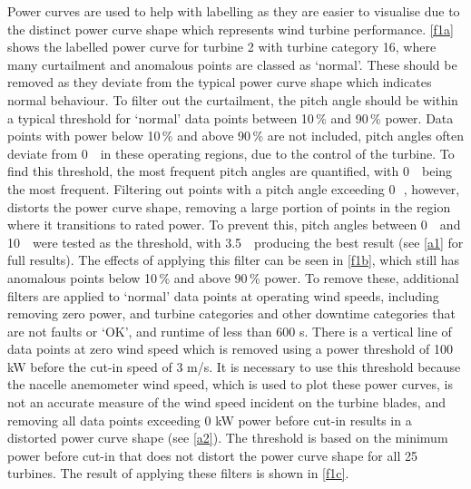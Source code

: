 Power curves are used to help with labelling as they are easier to visualise
due to the distinct power curve shape which represents wind turbine
performance. \autoref{f1a} shows the labelled power curve for turbine 2 with
turbine category 16, where many curtailment and anomalous points are classed
as `normal'. These should be removed as they deviate from the typical power
curve shape which indicates normal behaviour. To filter out the curtailment,
the pitch angle should be within a typical threshold for `normal' data points
between 10\,\% and 90\,\% power. Data points with power below 10\,\% and above
90\,\% are not included, pitch angles often deviate from 0\,\textdegree~ in
these operating regions, due to the control of the turbine. To find this
threshold, the most frequent pitch angles are quantified, with 0\,\textdegree~
being the most frequent. Filtering out points with a pitch angle exceeding
0\,\textdegree~, however, distorts the power curve shape, removing a large
portion of points in the region where it transitions to rated power. To
prevent this, pitch angles between 0\,\textdegree~ and 10\,\textdegree~ were
tested as the threshold, with 3.5\,\textdegree~ producing the best result (see
\autoref{a1} for full results). The effects of applying this filter can be
seen in \autoref{f1b}, which still has anomalous points below 10\,\% and above
90\,\% power. To remove these, additional filters are applied to `normal' data
points at operating wind speeds, including removing zero power, and turbine
categories and other downtime categories that are not faults or `OK', and
runtime of less than 600 s. There is a vertical line of data points at zero
wind speed which is removed using a power threshold of 100 kW before the
cut-in speed of 3 m/s. It is necessary to use this threshold because the
nacelle anemometer wind speed, which is used to plot these power curves, is
not an accurate measure of the wind speed incident on the turbine blades, and
removing all data points exceeding 0 kW power before cut-in results in a
distorted power curve shape (see \autoref{a2}). The threshold is based on the
minimum power before cut-in that does not distort the power curve shape for
all 25 turbines. The result of applying these filters is shown in
\autoref{f1c}.


